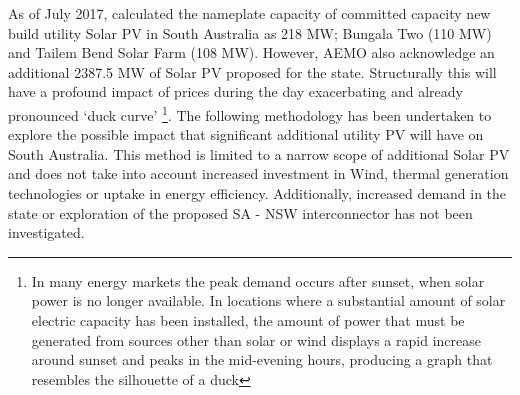 As of July 2017, \textcite{sa_aemo} calculated the nameplate capacity of committed capacity new build utility Solar PV in South Australia as 218 MW; Bungala Two (110 MW) and Tailem Bend Solar Farm (108 MW). However, AEMO also acknowledge an additional 2387.5 MW of Solar PV proposed for the state. Structurally this will have a profound impact of prices during the day exacerbating and already pronounced `duck curve' \footnote{In many energy markets the peak demand occurs after sunset, when solar power is no longer available. In locations where a substantial amount of solar electric capacity has been installed, the amount of power that must be generated from sources other than solar or wind displays a rapid increase around sunset and peaks in the mid-evening hours, producing a graph that resembles the silhouette of a duck}. The following methodology has been undertaken to explore the possible impact that significant additional utility PV will have on South Australia. This method is limited to a narrow scope of additional Solar PV and does not take into account increased investment in Wind, thermal generation technologies or uptake in energy efficiency. Additionally, increased demand in the state or exploration of the proposed SA - NSW interconnector has not been investigated. 
